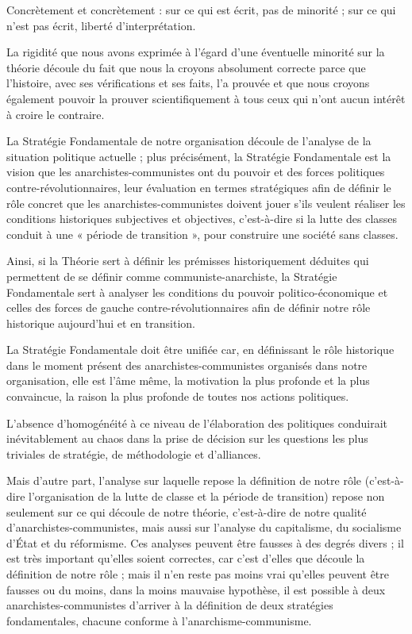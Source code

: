 Concrètement et concrètement : sur ce qui est écrit, pas de minorité ; sur ce qui n'est pas écrit, liberté d'interprétation.

La rigidité que nous avons exprimée à l'égard d'une éventuelle minorité sur la théorie découle du fait que nous la croyons absolument correcte parce que l'histoire, avec ses vérifications et ses faits, l'a prouvée et que nous croyons également pouvoir la prouver scientifiquement à tous ceux qui n'ont aucun intérêt à croire le contraire.

La Stratégie Fondamentale de notre organisation découle de l'analyse de la situation politique actuelle ; plus précisément, la Stratégie Fondamentale est la vision que les anarchistes-communistes ont du pouvoir et des forces politiques contre-révolutionnaires, leur évaluation en termes stratégiques afin de définir le rôle concret que les anarchistes-communistes doivent jouer s'ils veulent réaliser les conditions historiques subjectives et objectives, c'est-à-dire si la lutte des classes conduit à une « période de transition », pour construire une société sans classes.

Ainsi, si la Théorie sert à définir les prémisses historiquement déduites qui permettent de se définir comme communiste-anarchiste, la Stratégie Fondamentale sert à analyser les conditions du pouvoir politico-économique et celles des forces de gauche contre-révolutionnaires afin de définir notre rôle historique aujourd'hui et en transition.

La Stratégie Fondamentale doit être unifiée car, en définissant le rôle historique dans le moment présent des anarchistes-communistes organisés dans notre organisation, elle est l'âme même, la motivation la plus profonde et la plus convaincue, la raison la plus profonde de toutes nos actions politiques.

L'absence d'homogénéité à ce niveau de l'élaboration des politiques conduirait inévitablement au chaos dans la prise de décision sur les questions les plus triviales de stratégie, de méthodologie et d'alliances.

Mais d'autre part, l'analyse sur laquelle repose la définition de notre rôle (c'est-à-dire l'organisation de la lutte de classe et la période de transition) repose non seulement sur ce qui découle de notre théorie, c'est-à-dire de notre qualité d'anarchistes-communistes, mais aussi sur l'analyse du capitalisme, du socialisme d'État et du réformisme. Ces analyses peuvent être fausses à des degrés divers ; il est très important qu'elles soient correctes, car c'est d'elles que découle la définition de notre rôle ; mais il n'en reste pas moins vrai qu'elles peuvent être fausses ou du moins, dans la moins mauvaise hypothèse, il est possible à deux anarchistes-communistes d'arriver à la définition de deux stratégies fondamentales, chacune conforme à l'anarchisme-communisme.

